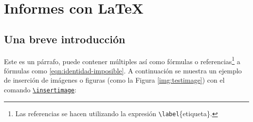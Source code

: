 %
%

\section{Informes con \LaTeX}

	\subsection{Una breve introducción}
		
		Este es un párrafo, puede contener múltiples  así como fórmulas o referencias\footnote{Las referencias se hacen utilizando la expresión \texttt{\textbackslash label}\{etiqueta\}.} a fórmulas como \eqref{eqn:identidad-imposible}. A continuación se muestra un ejemplo de inserción de imágenes o figuras (como la Figura \ref{img:testimage}) con el comando \href{https://latex.ppizarror.com/informe.html#hlp-imagen}{\texttt{\textbackslash insertimage}}:


